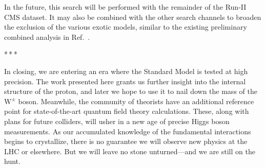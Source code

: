 In the future, this search will be performed with the remainder of the Run-II CMS dataset.
It may also be combined with the other search channels to broaden the exclusion
of the various exotic models, similar to the existing preliminary combined analysis
in Ref.~\cite{CMS-PAPER-HIG-16-016}.

\bigskip\par\centerline{*\,*\,*}\medskip\par

In closing, we are entering an era where the Standard Model is tested at high precision.
The work presented here grants us further insight into the internal structure of the proton, and later we hope to use it to nail down the mass of the $\mathrm{W^\pm}$ boson.
Meanwhile, the community of theorists have an additional reference point for state-of-the-art quantum field theory calculations.
These, along with plans for future colliders, will usher in a new age of precise Higgs boson measurements.
As our accumulated knowledge of the fundamental interactions begins to crystallize, there is no guarantee we will observe new physics at the LHC or elsewhere.
But we will leave no stone unturned---and we are still on the hunt.
